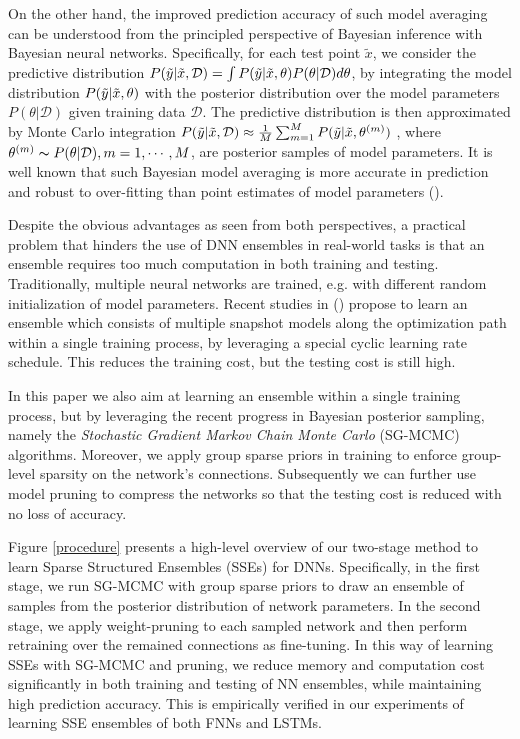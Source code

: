\documentclass{article} %
\begin{document}
On the other hand, the improved prediction accuracy of such model averaging can be understood from the principled perspective of Bayesian inference with Bayesian neural networks.
Specifically, for each test point $\tilde{x}$, we consider the predictive distribution 
$P(\tilde{\mathnormal{y}}|\tilde{x},\mathcal{D}) = \int P(\tilde{\mathnormal{y}}|\tilde{x},\theta) P(\theta|\mathcal{D})d\theta $, by integrating the model distribution $P(\tilde{\mathnormal{y}}|\tilde{x},\theta)$ with the posterior distribution over the model parameters $ P(\theta|\mathcal{D})$ given training data $\mathcal{D}$. 
The predictive distribution is then approximated by Monte Carlo integration 
$
P(\tilde{\mathnormal{y}}|\tilde{x},\mathcal{D}) \approx
\frac{1}{M} \sum_{m=1}^{M} P(\tilde{\mathnormal{y}}|\tilde{x},\theta^{(m)})
$
, where $\theta^{(m)} \thicksim P(\theta|\mathcal{D}), m=1,\cdots,M$, are posterior samples of model parameters.
It is well known that such Bayesian model averaging is more accurate in prediction and robust to over-fitting than point estimates of model parameters (\citet{balan2015bayesian,li2016preconditioned,gan2016scalable}).

Despite the obvious advantages as seen from both perspectives, a practical problem that hinders the use of DNN ensembles in real-world tasks is that an ensemble requires too much computation in both training and testing.
Traditionally, multiple neural networks are trained, e.g. with different random initialization of model parameters.
Recent studies in (\citet{loshchilov2016sgdr,huang2017snapshot}) propose to learn an ensemble which consists of multiple snapshot models along the optimization path within a single training process, by leveraging a special cyclic learning rate schedule. This reduces the training cost, but the testing cost is still high.

In this paper we also aim at learning an ensemble within a single training process, but by leveraging the recent progress in Bayesian posterior sampling, namely the \textit{Stochastic Gradient Markov Chain Monte Carlo} (SG-MCMC) algorithms.
Moreover, we apply group sparse priors in training to enforce group-level sparsity on the network's connections. Subsequently we can further use model pruning to compress the networks so that the testing cost is reduced with no loss of accuracy.

Figure \ref{procedure} presents a high-level overview of our two-stage method to learn Sparse Structured Ensembles (SSEs) for DNNs.
Specifically, in the first stage, we run SG-MCMC with group sparse priors to draw an ensemble of samples from the posterior distribution of network parameters.
In the second stage, we apply weight-pruning to each sampled network and then perform retraining over the remained connections as fine-tuning.
In this way of learning SSEs with SG-MCMC and pruning, we reduce memory and computation cost significantly in both training and testing of NN ensembles, while maintaining high prediction accuracy. This is empirically verified in our experiments of learning SSE ensembles of both FNNs and LSTMs.
\end{document}
